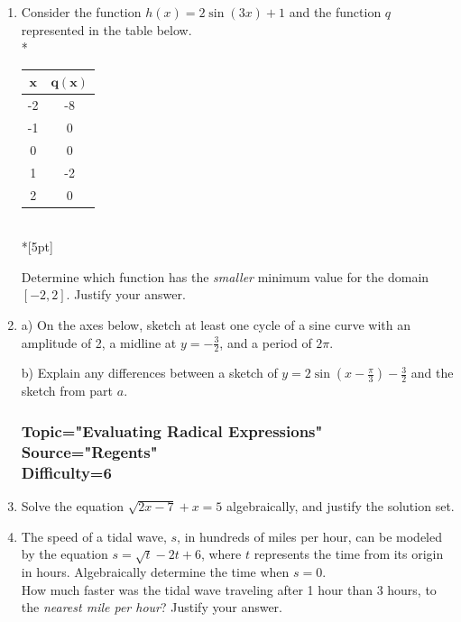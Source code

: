 \documentclass[12pt, oneside]{article}
\begin{document}
\begin{enumerate}
\item Consider the function $h(x) = 2\sin(3x) + 1$ and the function $q$ represented in the table below.\\*
\begin{center}
\begin{tabular}{|c|c|}
    \hline 
    $\boldsymbol{x}$ & $\boldsymbol{q(x)}$\\ 
    \hline 
    -2 & -8 \\ 
    \hline 
    -1 & 0 \\ 
    \hline 
    0 & 0 \\ 
    \hline 
    1 & -2 \\ 
    \hline 
    2 & 0 \\ 
    \hline 
\end{tabular}\\*[5pt]
\end{center}
Determine which function has the \emph{smaller} minimum value for the domain $[-2,2]$. Justify your answer. %

\item a) On the axes below, sketch at least one cycle of a sine curve with an amplitude of 2, a midline at $\displaystyle y = -\frac{3}{2}$, and a period of $2\pi$. 
\begin{center}
\end{center}
b) Explain any differences between a sketch of $\displaystyle y = 2 \sin \left( x- \frac{\pi}{3} \right) -\frac{3}{2}$ and the sketch from part $a$. %

\subsubsection*{Topic="Evaluating Radical Expressions"\\ %
Source="Regents"\\
Difficulty=6}

\item Solve the equation $\sqrt{2x-7}+x=5$ algebraically, and justify the solution set.

\item The speed of a tidal wave, $s$, in hundreds of miles per hour, can be modeled by the equation $s= \sqrt{t} - 2t+6$, where $t$ represents the time from its origin in hours. Algebraically determine the time when $s=0$.\\[10pt]
How much faster was the tidal wave traveling after 1 hour than 3 hours, to the \emph{nearest mile per hour}? Justify your answer. %


\end{enumerate}
\end{document}
